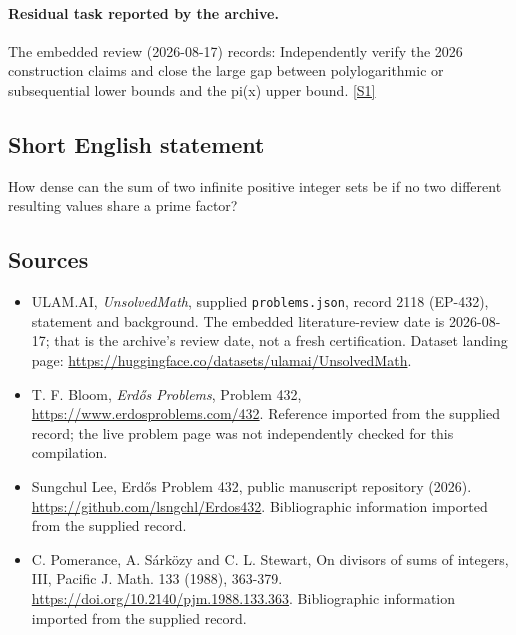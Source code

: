 \documentclass[11pt,a4paper]{article}
\newcommand{\sref}[2]{\hyperlink{source:#1:#2}{[S#2]}}
\begin{document}
\paragraph{Residual task reported by the archive.}

The embedded review (2026-08-17) records: Independently verify the 2026 construction claims and close the large gap between polylogarithmic or subsequential lower bounds and the pi(x) upper bound. \sref{2118}{1}

\subsection{Short English statement}

How dense can the sum of two infinite positive integer sets be if no two different resulting values share a prime factor?

\subsection{Sources}

{\small

\begin{itemize}

\item[\hypertarget{source:2118:1}{S1}] ULAM.AI, \emph{UnsolvedMath}, supplied \texttt{problems.json}, record 2118 (EP-432), statement and background. The embedded literature-review date is 2026-08-17; that is the archive’s review date, not a fresh certification. Dataset landing page: \url{https://huggingface.co/datasets/ulamai/UnsolvedMath}.

\item[\hypertarget{source:2118:2}{S2}] T. F. Bloom, \emph{Erdős Problems}, Problem 432, \url{https://www.erdosproblems.com/432}. Reference imported from the supplied record; the live problem page was not independently checked for this compilation.

\item[\hypertarget{source:2118:3}{S3}] Sungchul Lee, Erdős Problem 432, public manuscript repository (2026). \url{https://github.com/lsngchl/Erdos432}. Bibliographic information imported from the supplied record.

\item[\hypertarget{source:2118:4}{S4}] C. Pomerance, A. Sárközy and C. L. Stewart, On divisors of sums of integers, III, Pacific J. Math. 133 (1988), 363-379. \url{https://doi.org/10.2140/pjm.1988.133.363}. Bibliographic information imported from the supplied record.

\end{itemize}

}

\label{end:2118}
\end{document}
